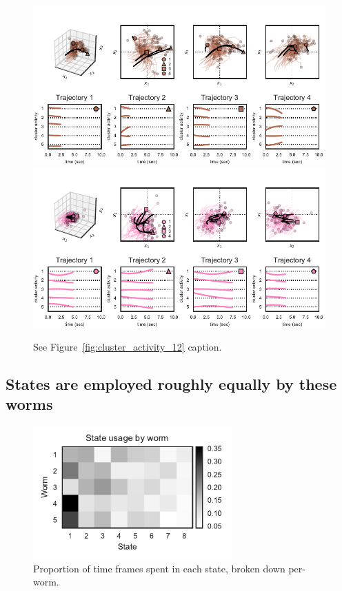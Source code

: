 \documentclass{article}
\begin{document}
\begin{figure}[h]
\centering
\includegraphics[width=5in]{figures/arhmm/cluster_activity_6.pdf}
\includegraphics[width=5in]{figures/arhmm/cluster_activity_7.pdf}
\caption{See Figure~\ref{fig:cluster_activity_12} caption.}
\label{fig:cluster_activity_78}
\end{figure}

\clearpage

\subsection{States are employed roughly equally by these worms}

\begin{figure}[h]
\centering
\includegraphics[width=3in]{figures/arhmm/state_usage_per_worm2.pdf}
\caption{Proportion of time frames spent in each state, broken down per-worm.}
\label{fig:usage}
\end{figure}
\end{document}
